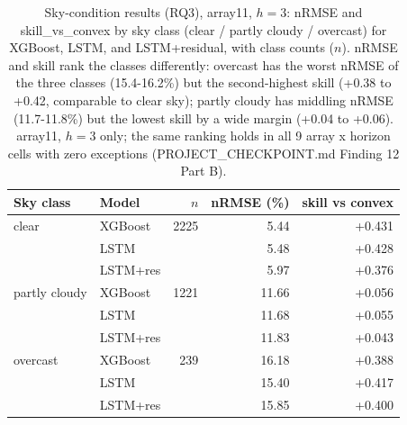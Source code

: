 \begin{table}[t]
  \centering
  \footnotesize
  \caption{Sky-condition results (RQ3), array11, $h=3$: nRMSE and
  skill\_vs\_convex by sky class (clear / partly cloudy / overcast) for
  XGBoost, LSTM, and LSTM+residual, with class counts ($n$). nRMSE and
  skill rank the classes differently: overcast has the worst nRMSE of
  the three classes (15.4-16.2\%) but the second-highest skill (+0.38 to
  +0.42, comparable to clear sky); partly cloudy has middling nRMSE
  (11.7-11.8\%) but the lowest skill by a wide margin (+0.04 to +0.06).
  array11, $h=3$ only; the same ranking holds in all 9 array x horizon
  cells with zero exceptions (PROJECT\_CHECKPOINT.md Finding 12 Part B).}
  \label{tab:T7}
  \begin{tabular}{llrrr}
    \toprule
    Sky class & Model & $n$ & nRMSE (\%) & skill vs convex \\
    \midrule
    clear & XGBoost & 2225 & 5.44 & +0.431 \\
     & LSTM &  & 5.48 & +0.428 \\
     & LSTM+res &  & 5.97 & +0.376 \\
    \addlinespace
    partly cloudy & XGBoost & 1221 & 11.66 & +0.056 \\
     & LSTM &  & 11.68 & +0.055 \\
     & LSTM+res &  & 11.83 & +0.043 \\
    \addlinespace
    overcast & XGBoost & 239 & 16.18 & +0.388 \\
     & LSTM &  & 15.40 & +0.417 \\
     & LSTM+res &  & 15.85 & +0.400 \\
    \bottomrule
  \end{tabular}
\end{table}
